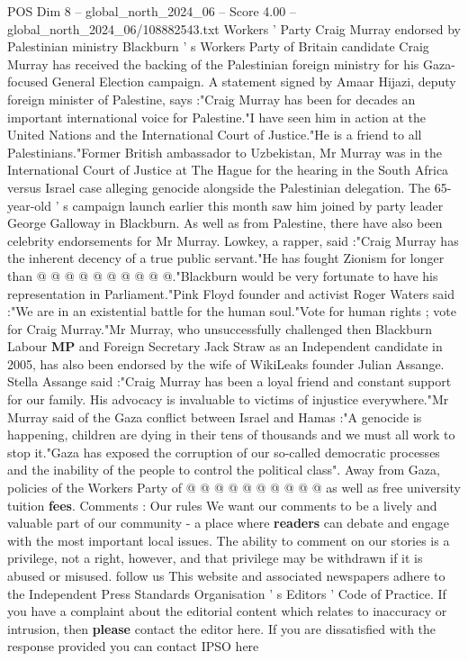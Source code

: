 \begin{textsample}{POS Dim 8 – global\_north\_2024\_06 – Score 4.00 – global\_north\_2024\_06/108882543.txt}  \label{ex:f8_pos_258}
Workers ' Party Craig Murray endorsed by Palestinian ministry Blackburn ' s Workers Party of Britain candidate Craig Murray has received the backing of the Palestinian foreign ministry for his Gaza-focused General Election campaign.
A statement signed by Amaar Hijazi, deputy foreign minister of Palestine, says :"Craig Murray has been for decades an important international voice for Palestine."I have seen him in action at the United Nations and the International Court of Justice."He is a friend to all Palestinians."Former British ambassador to Uzbekistan, Mr Murray was in the International Court of Justice at The Hague for the hearing in the South Africa versus Israel case alleging genocide alongside the Palestinian delegation.
The 65-year-old ' s campaign launch earlier this month saw him joined by party leader George Galloway in Blackburn.
As well as from Palestine, there have also been celebrity endorsements for Mr Murray.
Lowkey, a rapper, said :"Craig Murray has the inherent decency of a true public servant."He has fought Zionism for longer than @ @ @ @ @ @ @ @ @ @."Blackburn would be very fortunate to have his representation in Parliament."Pink Floyd founder and activist Roger Waters said :"We are in an existential battle for the human soul."Vote for human rights ; vote for Craig Murray."Mr Murray, who unsuccessfully challenged then Blackburn Labour \textbf{MP} and Foreign Secretary Jack Straw as an Independent candidate in 2005, has also been endorsed by the wife of WikiLeaks founder Julian Assange.
Stella Assange said :"Craig Murray has been a loyal friend and constant support for our family.
His advocacy is invaluable to victims of injustice everywhere."Mr Murray said of the Gaza conflict between Israel and Hamas :"A genocide is happening, children are dying in their tens of thousands and we must all work to stop it."Gaza has exposed the corruption of our so-called democratic processes and the inability of the people to control the political class".
Away from Gaza, policies of the Workers Party of @ @ @ @ @ @ @ @ @ @ as well as free university tuition \textbf{fees}.
Comments : Our rules We want our comments to be a lively and valuable part of our community - a place where \textbf{readers} can debate and engage with the most important local issues.
The ability to comment on our stories is a privilege, not a right, however, and that privilege may be withdrawn if it is abused or misused. follow us This website and associated newspapers adhere to the Independent Press Standards Organisation ' s Editors ' Code of Practice.
If you have a complaint about the editorial content which relates to inaccuracy or intrusion, then \textbf{please} contact the editor here.
If you are dissatisfied with the response provided you can contact IPSO here

\end{textsample}
